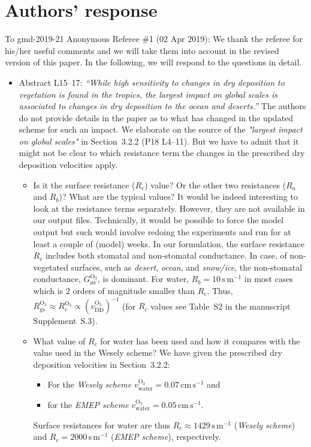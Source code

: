 \documentclass{scrartcl}
\begin{document}
\section*{Authors' response}
To gmd-2019-21 Anonymous Referee \#1 (02 Apr 2019):
We thank the referee for his/her useful comments and we will take them into account in the revised version of this paper.
In the following, we will respond to the questions in detail.
\begin{itemize}
\item {\color{blue}  Abstract L15--17: \emph{“While high sensitivity to changes in dry deposition to
    vegetation is found in the tropics, the largest impact on global scales is associated to
    changes in dry deposition to the ocean and deserts.”} The authors do not provide details
  in the paper as to what has changed in the updated scheme for such an impact.}
  We elaborate on the source of the \emph{"largest impact on global scales"} in Section~3.2.2 (P18 L4--11). But we have to admit that it might not be clear to which resistance term the changes in the prescribed dry deposition velocities apply. 
  \begin{itemize}
  \item {\color{blue} Is it the surface resistance ($R_c$) value? Or the other two resistances ($R_a$ and $R_b$)? What are the typical values?}
    It would be indeed interesting to look at the resistance terms separately. However, they are not available in our output files.
    Technically, it would be possible to force the model output but such would involve redoing the experiments and run for at least a couple of (model) weeks. In our formulation, the surface resistance $R_c$ includes both stomatal and non-stomatal conductance. In case, of non-vegetated surfaces, such as \emph{desert}, \emph{ocean}, and \emph{snow/ice}, the non-stomatal conductance, $G_\mathrm{ns}^\mathrm{O_3}$, is dominant. For water, $R_b = 10\,\mathrm{s\,m^{-1}}$ in most cases which is $2$ orders of magnitude smaller than $R_c$. Thus, $R_\mathrm{gs}^\mathrm{O_3} \approx R_c^\mathrm{O_3} \propto (v_\mathrm{DD}^\mathrm{O_3})^{-1}$ (for $R_c$ values see Table~S2 in the manuscript Supplement~S.3).
  \item {\color{blue} What value of $R_c$ for water has been used and how it compares with the value used in the Wesely scheme?}
    We have given the prescribed dry deposition velocities in Section~3.2.2:
    \begin{itemize}
      \item For the \emph{Wesely scheme}
        $v_\mathrm{water}^\mathrm{O_3} = 0.07\,\mathrm{cm\,s^{-1}}$ and
        \item for the \emph{EMEP scheme}
          $v_\mathrm{water}^\mathrm{O_3} = 0.05\,\mathrm{cm\,s^{-1}}$.
    \end{itemize}
    Surface resistances for water are thus $R_c \approx 1429\,\mathrm{s\,m^{-1}}$ (\emph{Wesely scheme}) and $R_c = 2000\,\mathrm{s\,m^{-1}}$ (\emph{EMEP scheme}), respectively.
  \end{itemize}


\end{itemize}
\end{document}
